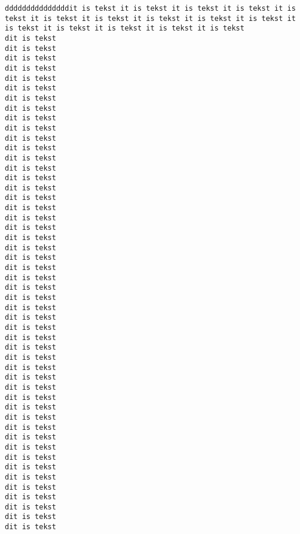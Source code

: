 \documentclass[a4paper,12pt]{article}
\begin{document}
\begin{verbatim}
dddddddddddddddit is tekst it is tekst it is tekst it is tekst it is tekst it is tekst it is tekst it is tekst it is tekst it is tekst it is tekst it is tekst it is tekst it is tekst it is tekst
dit is tekst
dit is tekst
dit is tekst
dit is tekst
dit is tekst
dit is tekst
dit is tekst
dit is tekst
dit is tekst
dit is tekst
dit is tekst
dit is tekst
dit is tekst
dit is tekst
dit is tekst
dit is tekst
dit is tekst
dit is tekst
dit is tekst
dit is tekst
dit is tekst
dit is tekst
dit is tekst
dit is tekst
dit is tekst
dit is tekst
dit is tekst
dit is tekst
dit is tekst
dit is tekst
dit is tekst
dit is tekst
dit is tekst
dit is tekst
dit is tekst
dit is tekst
dit is tekst
dit is tekst
dit is tekst
dit is tekst
dit is tekst
dit is tekst
dit is tekst
dit is tekst
dit is tekst
dit is tekst
dit is tekst
dit is tekst
dit is tekst
dit is tekst
\end{verbatim}
\end{document}
